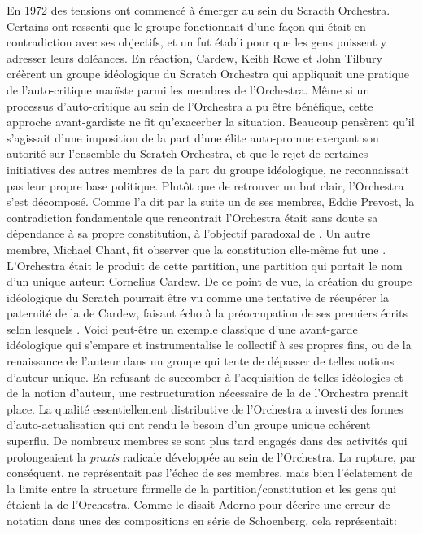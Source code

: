 {En 1972 des tensions ont commenc\'e \`a \'emerger au sein du Scracth
Orchestra. Certains ont ressenti que le groupe fonctionnait d'une
fa\c{c}on qui \'etait en contradiction avec ses objectifs, et un
 fut \'etabli pour que les gens puissent y
adresser leurs dol\'eances. En r\'eaction, Cardew, Keith Rowe et John
Tilbury cr\'e\`erent un groupe id\'eologique du Scratch Orchestra qui
appliquait une pratique de l'auto{}-critique mao\"iste parmi les
membres de l'Orchestra. M\^eme si un processus d'auto{}-critique au
sein de l'Orchestra a pu \^etre b\'en\'efique, cette approche
avant{}-gardiste ne fit qu'exacerber la situation. Beaucoup pens\`erent
qu'il s'agissait d'une imposition de la part d'une \'elite
auto{}-promue exer\c{c}ant son autorit\'e sur l'ensemble du Scratch
Orchestra, et que le rejet de certaines initiatives des autres membres
de la part du groupe id\'eologique, ne reconnaissait pas leur propre
base politique. Plut\^ot que de retrouver un but clair, l'Orchestra
s'est d\'ecompos\'e. Comme l'a dit par la suite un de ses membres,
Eddie Prevost, la contradiction fondamentale que rencontrait
l'Orchestra \'etait sans doute sa d\'ependance \`a sa propre
constitution, \`a l'objectif paradoxal de . Un autre membre, Michael Chant, fit observer que
la constitution elle{}-m\^eme fut une . L'Orchestra \'etait
le produit de cette partition, une partition qui portait le nom d'un
unique auteur: Cornelius Cardew. De ce point de vue, la cr\'eation du
groupe id\'eologique du Scratch pourrait \^etre vu comme une tentative
de r\'ecup\'erer la paternit\'e de la  de Cardew, faisant
\'echo \`a la pr\'eoccupation de ses premiers \'ecrits selon lesquels
. Voici peut{}-\^etre un
exemple classique d'une avant{}-garde id\'eologique qui s'empare et
instrumentalise le collectif \`a ses propres fins, ou de la renaissance
de l'auteur dans un groupe qui tente de d\'epasser de telles notions
d'auteur unique. En refusant de succomber \`a l'acquisition de telles
id\'eologies et de la notion d'auteur, une restructuration n\'ecessaire
de la  de l'Orchestra prenait place. La qualit\'e
essentiellement distributive de l'Orchestra a investi des formes
d'auto{}-actualisation qui ont rendu le besoin d'un groupe unique
coh\'erent superflu. De nombreux membres se sont plus tard engag\'es
dans des activit\'es qui prolongeaient la {\em praxis} radicale
d\'evelopp\'ee au sein de l'Orchestra. La rupture, par cons\'equent, ne
repr\'esentait pas l'\'echec de ses membres, mais bien l'\'eclatement
de la limite entre la structure formelle de la partition/constitution
et les gens qui \'etaient la  de l'Orchestra. Comme le
disait Adorno pour d\'ecrire une erreur de notation dans unes des
compositions en s\'erie de Schoenberg, cela repr\'esentait:

}
